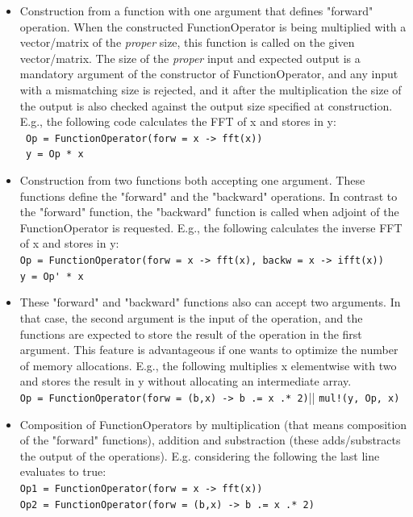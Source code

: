 \begin{itemize}
    \item Construction from a function with one argument that defines "forward" operation. When the constructed FunctionOperator is being multiplied with a vector/matrix of the \textit{proper} size, this function is called on the given vector/matrix. The size of the \textit{proper} input and expected output is a mandatory argument of the constructor of FunctionOperator, and any input with a mismatching size is rejected, and it after the multiplication the size of the output is also checked against the output size specified at construction. E.g., the following code calculates the FFT of x and stores in y:\\
    \lstinline{ Op = FunctionOperator(forw = x -> fft(x))}\\
    \lstinline{ y = Op * x}
    \item Construction from two functions both accepting one argument. These functions define the "forward" and the "backward" operations. In contrast to the "forward" function, the "backward" function is called when adjoint of the FunctionOperator is requested. E.g., the following calculates the inverse FFT of x and stores in y:\\
    \lstinline{Op = FunctionOperator(forw = x -> fft(x), backw = x -> ifft(x))}\\
    \lstinline{y = Op' * x}
    \item These "forward" and "backward" functions also can accept two arguments. In that case, the second argument is the input of the operation, and the functions are expected to store the result of the operation in the first argument. This feature is advantageous if one wants to optimize the number of memory allocations. E.g., the following multiplies x elementwise with two and stores the result in y without allocating an intermediate array.\\
    \lstinline{Op = FunctionOperator(forw = (b,x) -> b .= x .* 2)}||
    \lstinline{mul!(y, Op, x)} 
    \item Composition of FunctionOperators by multiplication (that means composition of the "forward" functions), addition and substraction (these adds/substracts the output of the operations). E.g. considering the following the last line evaluates to true:\\
    \lstinline{Op1 = FunctionOperator(forw = x -> fft(x))}\\
    \lstinline{Op2 = FunctionOperator(forw = (b,x) -> b .= x .* 2)}\\

\end{itemize}
